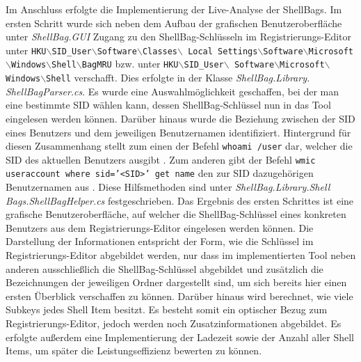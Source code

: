 Im Anschluss erfolgte die Implementierung der Live-Analyse der ShellBags. Im ersten Schritt wurde sich neben dem Aufbau der grafischen Benutzeroberfläche unter \textit{ShellBag.GUI} Zugang zu den ShellBag-Schlüsseln im Registrierungs-Editor unter \texttt{HKU$\backslash$SID\_User$\backslash$Software$\backslash$Classes$\backslash$ \newline Local Settings$\backslash$Software$\backslash$Microsoft$\backslash$Windows$\backslash$Shell$\backslash$BagMRU} bzw. unter \texttt{HKU$\backslash$SID\_User$\backslash$ \newline Software$\backslash$Microsoft$\backslash$Windows$\backslash$Shell} verschafft. Dies erfolgte in der Klasse \textit{ShellBag.Library. \newline ShellBagParser.cs}. Es wurde eine Auswahlmöglichkeit geschaffen, bei der man eine bestimmte SID wählen kann, dessen ShellBag-Schlüssel nun in das Tool eingelesen werden können. Darüber hinaus wurde die Beziehung zwischen der SID eines Benutzers und dem jeweiligen Benutzernamen identifiziert. Hintergrund für diesen Zusammenhang stellt zum einen der Befehl \glqq \texttt{whoami /user}\grqq{} dar, welcher die SID des aktuellen Benutzers ausgibt \cite{whoami}. Zum anderen gibt der Befehl \glqq \texttt{wmic useraccount where sid='<SID>' get name}\grqq{} den zur SID dazugehörigen Benutzernamen aus \cite{sid}. Diese Hilfsmethoden sind unter \textit{ShellBag.Library.Shell \newline Bags.ShellBagHelper.cs} festgeschrieben. Das Ergebnis des ersten Schrittes ist eine grafische Benutzeroberfläche, auf welcher die ShellBag-Schlüssel eines konkreten Benutzers aus dem Registrierungs-Editor eingelesen werden können. Die Darstellung der Informationen entspricht der Form, wie die Schlüssel im Registrierungs-Editor abgebildet werden, nur dass im implementierten Tool neben anderen ausschließlich die ShellBag-Schlüssel abgebildet und zusätzlich die Bezeichnungen der jeweiligen Ordner dargestellt sind, um sich bereits hier einen ersten Überblick verschaffen zu können. Darüber hinaus wird berechnet, wie viele Subkeys jedes Shell Item besitzt. Es besteht somit ein optischer Bezug zum Registrierungs-Editor, jedoch werden noch Zusatzinformationen abgebildet. Es erfolgte außerdem eine Implementierung der Ladezeit sowie der Anzahl aller Shell Items, um später die Leistungseffizienz bewerten zu können.

